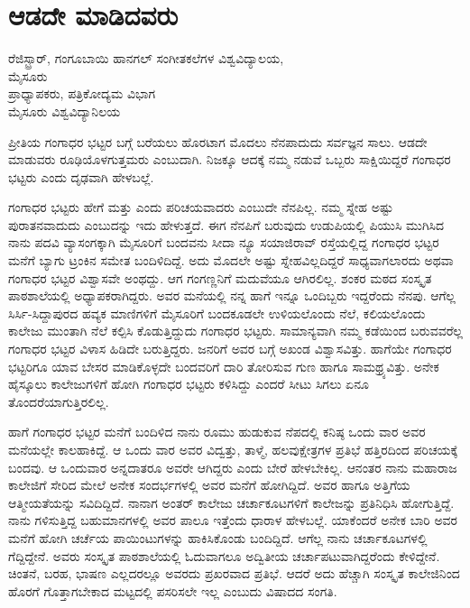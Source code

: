\chapter{ಆಡದೇ ಮಾಡಿದವರು}

\begin{center}
\smallskip

ರೆಜಿಸ್ಟ್ರಾರ್, ಗಂಗೂಬಾಯಿ ಹಾನಗಲ್ ಸಂಗೀತಕಲೆಗಳ ವಿಶ್ವವಿದ್ಯಾಲಯ,\\
ಮೈಸೂರು\\
ಪ್ರಾಧ್ಯಾಪಕರು, ಪತ್ರಿಕೋದ್ಯಮ ವಿಭಾಗ\\
ಮೈಸೂರು ವಿಶ್ವವಿದ್ಯಾನಿಲಯ
\end{center}

ಪ್ರೀತಿಯ ಗಂಗಾಧರ ಭಟ್ಟರ ಬಗ್ಗೆ ಬರೆಯಲು ಹೊರಟಾಗ ಮೊದಲು ನೆನಪಾದುದು ಸರ್ವಜ್ಞನ ಸಾಲು. ಆಡದೇ ಮಾಡುವರು ರೂಢಿಯೊಳಗುತ್ತಮರು ಎಂಬುದಾಗಿ. ನಿಜಕ್ಕೂ ಆದಕ್ಕೆ ನಮ್ಮ ನಡುವೆ ಒಬ್ಬರು ಸಾಕ್ಷಿಯಿದ್ದರೆ ಗಂಗಾಧರ ಭಟ್ಟರು ಎಂದು ದೃಢವಾಗಿ ಹೇಳಬಲ್ಲೆ.

ಗಂಗಾಧರ ಭಟ್ಟರು ಹೇಗೆ ಮತ್ತು ಎಂದು ಪರಿಚಯವಾದರು ಎಂಬುದೇ ನೆನಪಿಲ್ಲ. ನಮ್ಮ ಸ್ನೇಹ ಅಷ್ಟು ಪುರಾತನವಾದುದು ಎಂಬುದನ್ನು ಇದು ಹೇಳುತ್ತದೆ. ಈಗ ನೆನಪಿಗೆ ಬರುವುದು ಉಡುಪಿಯಲ್ಲಿ ಪಿಯುಸಿ ಮುಗಿಸಿದ ನಾನು ಪದವಿ ವ್ಯಾಸಂಗಕ್ಕಾಗಿ ಮೈಸೂರಿಗೆ ಬಂದವನು ಸೀದಾ ನ್ಯೂ ಸಯಾಜಿರಾವ್ ರಸ್ತೆಯಲ್ಲಿದ್ದ ಗಂಗಾಧರ ಭಟ್ಟರ ಮನೆಗೆ ಬ್ಯಾಗು ಟ್ರಂಕಿನ ಸಮೇತ ಬಂದಿಳಿದಿದ್ದೆ. ಅದು ಮೊದಲೇ ಅಷ್ಟು ಸ್ನೇಹವಿಲ್ಲದಿದ್ದರೆ ಸಾಧ್ಯವಾಗಲಾರದು ಅಥವಾ ಗಂಗಾಧರ ಭಟ್ಟರ ವಿಶ್ವಾಸವೇ ಅಂಥದ್ದು. ಆಗ ಗಂಗಣ್ಣನಿಗೆ ಮದುವೆಯೂ ಆಗಿರಲಿಲ್ಲ. ಶಂಕರ ಮಠದ ಸಂಸ್ಕೃತ ಪಾಠಶಾಲೆಯಲ್ಲಿ ಅಧ್ಯಾಪಕರಾಗಿದ್ದರು. ಅವರ ಮನೆಯಲ್ಲಿ ನನ್ನ ಹಾಗೆ ಇನ್ನೂ ಒಂದಿಬ್ಬರು ಇದ್ದರೆಂದು ನೆನಪು. ಆಗೆಲ್ಲ ಸಿರ್ಸಿ-ಸಿದ್ದಾಪುರದ ಹವ್ಯಕ ಮಾಣಿಗಳಿಗೆ ಮೈಸೂರಿಗೆ ಬಂದಕೂಡಲೇ ಉಳಿಯಲೊಂದು ನೆಲೆ, ಕಲಿಯಲೊಂದು ಕಾಲೇಜು ಮುಂತಾಗಿ ನೆಲೆ ಕಲ್ಪಿಸಿ ಕೊಡುತ್ತಿದ್ದುದು ಗಂಗಾಧರ ಭಟ್ಟರು. ಸಾಮಾನ್ಯವಾಗಿ ನಮ್ಮ ಕಡೆಯಿಂದ ಬರುವವರೆಲ್ಲ ಗಂಗಾಧರ ಭಟ್ಟರ ವಿಳಾಸ ಹಿಡಿದೇ ಬರುತ್ತಿದ್ದರು. ಜನರಿಗೆ ಅವರ ಬಗ್ಗೆ ಅಖಂಡ ವಿಶ್ವಾಸವಿತ್ತು. ಹಾಗೆಯೇ ಗಂಗಾಧರ ಭಟ್ಟರಿಗೂ ಯಾವ ಬೇಸರ ಮಾಡಿಕೊಳ್ಳದೇ ಬಂದವರಿಗೆ ದಾರಿ ತೋರಿಸುವ ಗುಣ ಹಾಗೂ ಸಾಮಥ್ರ್ಯವಿತ್ತು. ಅನೇಕ ಹೈಸ್ಕೂಲು ಕಾಲೇಜುಗಳಿಗೆ ಹೋಗಿ ಗಂಗಾಧರ ಭಟ್ಟರು ಕಳಿಸಿದ್ದು ಎಂದರೆ ಸೀಟು ಸಿಗಲು ಏನೂ ತೊಂದರೆಯಾಗುತ್ತಿರಲಿಲ್ಲ.

ಹಾಗೆ ಗಂಗಾಧರ ಭಟ್ಟರ ಮನೆಗೆ ಬಂದಿಳಿದ ನಾನು ರೂಮು ಹುಡುಕುವ ನೆಪದಲ್ಲಿ ಕನಿಷ್ಠ ಒಂದು ವಾರ ಅವರ ಮನೆಯಲ್ಲೇ ಕಾಲಹಾಕಿದ್ದೆ. ಆ ಒಂದು ವಾರ ಅವರ ವಿದ್ವತ್ತು, ತಾಳ್ಮೆ, ಹಲವುಕ್ಷೇತ್ರಗಳ ಪ್ರತಿಭೆ ಹತ್ತಿರದಿಂದ ಪರಿಚಯಕ್ಕೆ ಬಂದವು. ಆ ಒಂದುವಾರ ಅನ್ನದಾತರೂ ಅವರೇ ಆಗಿದ್ದರು ಎಂದು ಬೇರೆ ಹೇಳಬೇಕಿಲ್ಲ. ಆನಂತರ ನಾನು ಮಹಾರಾಜ ಕಾಲೇಜಿಗೆ ಸೇರಿದ ಮೇಲೆ ಅನೇಕ ಸಂದರ್ಭಗಳಲ್ಲಿ ಅವರ ಮನೆಗೆ ಹೋಗಿದ್ದಿದೆ. ಅವರ ಹಾಗೂ ಅತ್ತಿಗೆಯ ಆತ್ಮೀಯತೆಯನ್ನು ಸವಿದಿದ್ದಿದೆ. ನಾನಾಗ ಅಂತರ್ ಕಾಲೇಜು ಚರ್ಚಾಕೂಟಗಳಿಗೆ ಕಾಲೇಜನ್ನು ಪ್ರತಿನಿಧಿಸಿ ಹೋಗುತ್ತಿದ್ದೆ. ನಾನು ಗಳಿಸುತ್ತಿದ್ದ ಬಹುಮಾನಗಳಲ್ಲಿ ಅವರ ಪಾಲೂ ಇತ್ತೆಂದು ಧಾರಾಳ ಹೇಳಬಲ್ಲೆ. ಯಾಕೆಂದರೆ ಅನೇಕ ಬಾರಿ ಅವರ ಮನೆಗೆ ಹೋಗಿ ಚರ್ಚೆಯ ಪಾಯಿಂಟುಗಳನ್ನು ಹಾಕಿಸಿಕೊಂಡು ಬಂದಿದ್ದಿದೆ. ಆಗೆಲ್ಲ ನಾನು ಚರ್ಚಾಕೂಟಗಳಲ್ಲಿ ಗೆದ್ದಿದ್ದೇನೆ. ಅವರು ಸಂಸ್ಕೃತ ಪಾಠಶಾಲೆಯಲ್ಲಿ ಓದುವಾಗಲೂ ಅದ್ವಿತೀಯ ಚರ್ಚಾಪಟುವಾಗಿದ್ದರೆಂದು ಕೇಳಿದ್ದೇನೆ. ಚಿಂತನೆ, ಬರಹ, ಭಾಷಣ ಎಲ್ಲದರಲ್ಲೂ ಅವರದು ಪ್ರಖರವಾದ ಪ್ರತಿಭೆ. ಆದರೆ ಅದು ಹೆಚ್ಚಾಗಿ ಸಂಸ್ಕೃತ ಕಾಲೇಜಿನಿಂದ ಹೊರಗೆ ಗೊತ್ತಾಗಬೇಕಾದ ಮಟ್ಟದಲ್ಲಿ ಪಸರಿಸಲೇ ಇಲ್ಲ ಎಂಬುದು ವಿಷಾದದ ಸಂಗತಿ.

